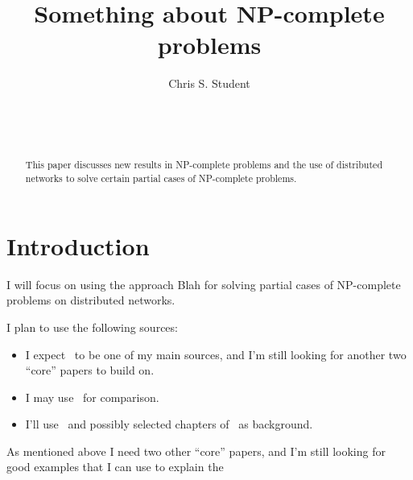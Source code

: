 \documentclass{sig-alternate}
\begin{document}

\title{Something about NP-complete problems}


\author{
\alignauthor
Chris S. Student\\
	\\
	\\
	\\
}

\maketitle

\begin{abstract}
This paper discusses new results in NP-complete problems and the use of distributed
networks to solve certain partial cases of NP-complete problems.
\end{abstract}

\section{Introduction}
I will focus on using the approach Blah for solving partial cases of
NP-complete problems on distributed networks.

I plan to use the following sources:
\begin{itemize}
\item I expect~\cite{OM:2008} to be one of my main sources, and I'm still looking for another two ``core'' papers to build on.
\item I may use~\cite{Brun:2008} for comparison. 
\item I'll use~\cite{Aaronson:2005, wiki:np-complete} and possibly selected chapters of~\cite{Garey:1979} as background. 
\end{itemize}

As mentioned above I need two other ``core'' papers, and I'm still looking for good examples that I can use to explain the 
\end{document}
